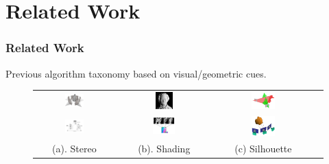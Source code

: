 \documentclass{beamer}
\begin{document}
\section{Related Work}

\begin{frame}
\tableofcontents[currentsection,currentsubsection, 
    hideothersubsections, 
    sectionstyle=show/shaded,]
\end{frame}

\begin{frame}
\frametitle{Related Work}

Previous algorithm taxonomy based on visual/geometric cues.
\begin{figure}
\begin{tabular}{cccc}
\includegraphics[width=0.25\textwidth]{images/mvs.png} &
\includegraphics[width=0.2\textwidth]{images/sfs.png} & 
\includegraphics[width=0.25\textwidth]{images/vh.jpg}\\
\includegraphics[width=0.25\textwidth]{images/sl.jpg} & 
\includegraphics[width=0.25\textwidth]{images/ps.png} &
\includegraphics[width=0.25\textwidth]{images/vh_1.png}\\
(a). Stereo & (b). Shading & (c) Silhouette \\
\end{tabular}
\end{figure}


\end{frame}
\end{document}
